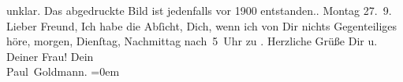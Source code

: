 \begin{ledgroupsized}[t]{13cm}
{{{{{                        unklar. Das abgedruckte Bild ist jedenfalls vor 1900 entstanden.}}}\label{K_L03252-1h}.}}\pend
           \pstart
           {\pb}Montag 27. 9.\pend
           \pstart
           Lieber Freund, Ich habe die Abſicht, Dich, wenn ich von
               Dir nichts Gegenteiliges höre, morgen, Dienſtag, Nachmittag nach 5 Uhr zu \label{K_L03252-2v}\label{K_L03252-2h}. Herzliche Grüße Dir u. Deiner Frau!\pend
           \pstart
           Dein {\\[\baselineskip]}\spacefill\mbox{Paul Goldmann.}\pend
           \leftskip=0em{}
         
         \endnumbering{}\end{ledgroupsized}  \newcommand{\dateiname}{L03252}\newcommand{\titel}{Paul Goldmann an Arthur Schnitzler, 27. 9. 1909}\newcommand{\editorInnen}{Martin Anton Müller und Laura Untner}
      